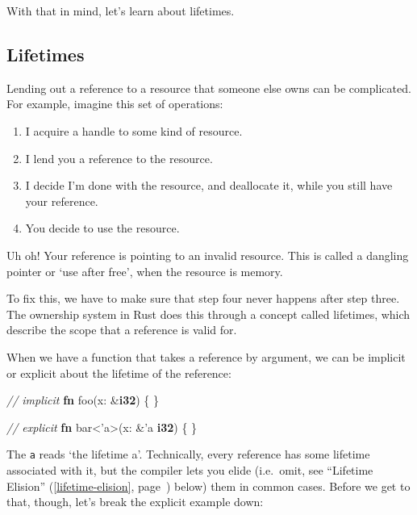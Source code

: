 \documentclass[a4paper,]{book}
\renewcommand*{\hyperref}[2][\ar]{%
  \def\ar{#2}%
  #2 (\autoref{#1}, page~\pageref{#1})}
\newenvironment{Shaded}{\begin{snugshade}}{\end{snugshade}}
\newcommand{\KeywordTok}[1]{\textcolor[rgb]{0.13,0.29,0.53}{\textbf{{#1}}}}
\newcommand{\CommentTok}[1]{\textcolor[rgb]{0.56,0.35,0.01}{\textit{{#1}}}}
\newcommand{\OtherTok}[1]{\textcolor[rgb]{0.56,0.35,0.01}{{#1}}}
\newcommand{\NormalTok}[1]{{#1}}
\begin{document}
With that in mind, let's learn about lifetimes.

\subsection{Lifetimes}\label{lifetimes}

Lending out a reference to a resource that someone else owns can be
complicated. For example, imagine this set of operations:

\begin{enumerate}
\def\labelenumi{\arabic{enumi}.}
\itemsep1pt\parskip0pt
\item
  I acquire a handle to some kind of resource.
\item
  I lend you a reference to the resource.
\item
  I decide I'm done with the resource, and deallocate it, while you
  still have your reference.
\item
  You decide to use the resource.
\end{enumerate}

Uh oh! Your reference is pointing to an invalid resource. This is called
a dangling pointer or `use after free', when the resource is memory.

To fix this, we have to make sure that step four never happens after
step three. The ownership system in Rust does this through a concept
called lifetimes, which describe the scope that a reference is valid
for.

When we have a function that takes a reference by argument, we can be
implicit or explicit about the lifetime of the reference:

\begin{Shaded}
\begin{Highlighting}[]
\CommentTok{// implicit}
\KeywordTok{fn} \NormalTok{foo(x: &}\KeywordTok{i32}\NormalTok{) \{}
\NormalTok{\}}

\CommentTok{// explicit}
\KeywordTok{fn} \NormalTok{bar<}\OtherTok{'a}\NormalTok{>(x: &}\OtherTok{'a} \KeywordTok{i32}\NormalTok{) \{}
\NormalTok{\}}
\end{Highlighting}
\end{Shaded}

The \texttt{\textquotesingle{}a} reads `the lifetime a'. Technically,
every reference has some lifetime associated with it, but the compiler
lets you elide (i.e.~omit, see \hyperref[lifetime-elision]{``Lifetime
Elision''} below) them in common cases. Before we get to that, though,
let's break the explicit example down:
\end{document}
